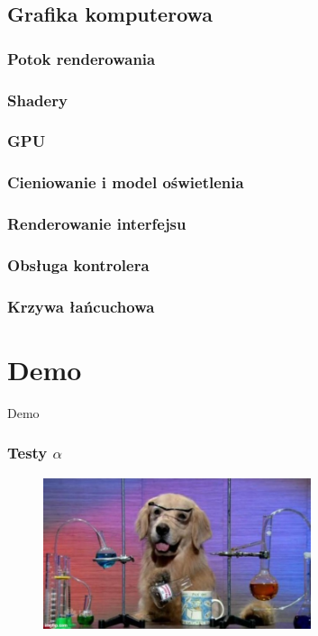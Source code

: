 \documentclass[aspectratio=169]{beamer}
\begin{document}
\subsection{Grafika komputerowa}

\begin{frame}[allowframebreaks]
	\frametitle{Potok renderowania}
	
\end{frame}

\begin{frame}[allowframebreaks]
	\frametitle{Shadery}
	
\end{frame}

\begin{frame}[allowframebreaks]
	\frametitle{GPU}
	
\end{frame}

\begin{frame}[allowframebreaks]
	\frametitle{Cieniowanie i model oświetlenia}
	
\end{frame}

\begin{frame}[allowframebreaks]
	\frametitle{Renderowanie interfejsu}
	
\end{frame}

\begin{frame}[allowframebreaks]
	\frametitle{Obsługa kontrolera}
	
\end{frame}

\begin{frame}[allowframebreaks]
	\frametitle{Krzywa łańcuchowa}
	
\end{frame}

\section{Demo}

\begin{frame}
	  \begin{center}
	\Huge Demo
	\end{center}
\end{frame}


\begin{frame}
	\frametitle{Testy $\alpha$} %
	\begin{figure}
		\centering
		\includegraphics[width=0.7\textwidth]{dog.jpg}
	\end{figure}
\end{frame}
\end{document}
